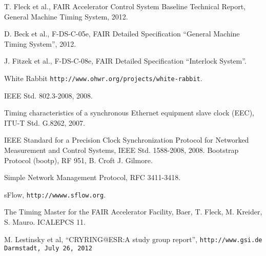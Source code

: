 \begin{thebibliography}{9}   %

 T. Fleck et al., FAIR Accelerator Control System Baseline
Technical Report, General Machine Timing System, 2012.

D. Beck et al., F-DS-C-05e, FAIR Detailed Specification
“General Machine Timing System”, 2012.

 J. Fitzek et al., F-DS-C-08e, FAIR Detailed Specification
“Interlock System”.

White Rabbit \texttt{http://www.ohwr.org/projects/white-rabbit}.

 IEEE Std. 802.3-2008, 2008.
 
Timing characteristics of a synchronous Ethernet equipment slave clock 
(EEC), ITU-T Std. G.8262, 2007.
 
IEEE Standard for a Precision Clock Synchronization Protocol for
  Networked Measurement and Control Systems, IEEE Std. 1588-2008,
  2008.
 Bootstrap Protocol (bootp), RF 951, B. Croft J. Gilmore.

 Simple Network Management Protocol, RFC 3411-3418.

 sFlow, \texttt{http://wwww.sflow.org}.

 The Timing Master for the FAIR Accelerator Facility, Baer, T.
Fleck, M. Kreider, S. Mauro. ICALEPCS 11.  

 M. Lestinsky et al, “CRYRING@ESR:A study group report”, \texttt{http://www.gsi.de Darmstadt, July 26, 2012}


\end{thebibliography}


